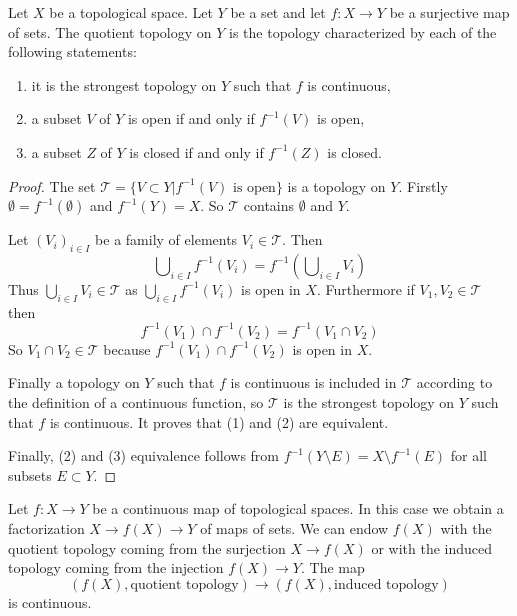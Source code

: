 \begin{lemma}
\label{lemma-quotient}
Let $X$ be a topological space. Let $Y$ be a set and let $f : X \to Y$
be a surjective map of sets. The quotient topology on $Y$ is the
topology characterized by each of the following statements:
\begin{enumerate}
\item it is the strongest topology on $Y$ such that $f$ is continuous,
\item a subset $V$ of $Y$ is open if and only if $f^{-1}(V)$ is open,
\item a subset $Z$ of $Y$ is closed if and only if $f^{-1}(Z)$ is closed.
\end{enumerate}
\end{lemma}

\begin{proof}
The set $\mathcal{T} = \{V\subset Y | f^{-1}(V) \text{ is open}\}$ is a
topology on $Y$. Firstly $\emptyset = f^{-1}(\emptyset)$ and $f^{-1}(Y) = X$.
So $\mathcal{T}$ contains $\emptyset$ and $Y$.

\medskip\noindent
Let $(V_i)_{i \in I}$ be a family of elements $V_i \in \mathcal{T}$.
Then
$$
\bigcup\nolimits_{i\in I} f^{-1}(V_i) =
f^{-1}\left(\bigcup\nolimits_{i\in I} V_i\right)
$$
Thus $\bigcup_{i\in I} V_i \in \mathcal{T}$ as
$\bigcup_{i\in I}f^{-1}(V_i)$ is open in $X$.
Furthermore if $V_1, V_2 \in \mathcal{T}$ then
$$
f^{-1}(V_1) \cap f^{-1}(V_2) = f^{-1}(V_1 \cap V_2)
$$
So $V_1 \cap V_2 \in \mathcal{T}$ because
$f^{-1}(V_1) \cap f^{-1}(V_2)$ is open in $X$.

\medskip\noindent
Finally a topology on $Y$ such that $f$ is continuous is included in
$\mathcal{T}$ according to the definition of a continuous function, so
$\mathcal{T}$ is the strongest topology on $Y$ such that $f$ is continuous. It
proves that (1) and (2) are equivalent.

\medskip\noindent
Finally, (2) and (3) equivalence follows from $f^{-1}(Y \setminus E) = X
\setminus f^{-1}(E)$ for all subsets $E \subset Y$.
\end{proof}

\noindent
Let $f : X \to Y$ be a continuous map of topological spaces.
In this case we obtain a factorization $X \to f(X) \to Y$
of maps of sets. We can endow $f(X)$ with the
quotient topology coming from the surjection $X \to f(X)$
or with the induced topology coming from the injection $f(X) \to Y$.
The map
$$
(f(X), \text{quotient topology})
\longrightarrow
(f(X), \text{induced topology})
$$
is continuous.

